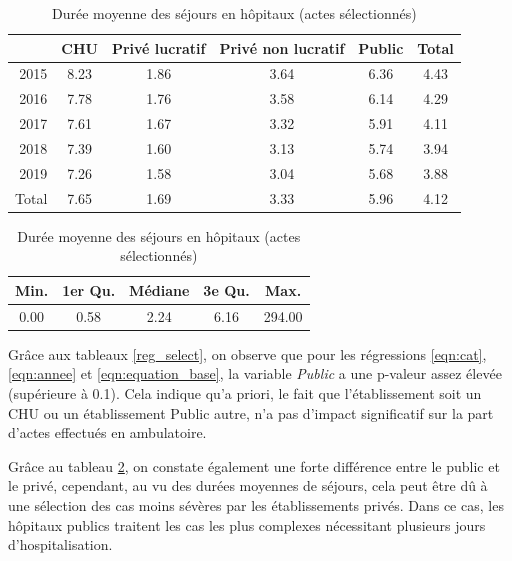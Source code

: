 \begin{table}[ht]
\centering
\caption{Durée moyenne des séjours en hôpitaux (actes sélectionnés)} 
\label{dms_select_moy}
\begin{tabular}{r|cccc|c}
  \hline
 & CHU & Privé lucratif & Privé non lucratif & Public & Total \\ 
  \hline
2015 & 8.23 & 1.86 & 3.64 & 6.36 & 4.43 \\ 
  2016 & 7.78 & 1.76 & 3.58 & 6.14 & 4.29 \\ 
  2017 & 7.61 & 1.67 & 3.32 & 5.91 & 4.11 \\ 
  2018 & 7.39 & 1.60 & 3.13 & 5.74 & 3.94 \\ 
  2019 & 7.26 & 1.58 & 3.04 & 5.68 & 3.88 \\ 
  \hline
  Total & 7.65 & 1.69 & 3.33 & 5.96 & 4.12 \\ 
   \hline
\end{tabular}

\bigskip

\begin{tabular}{ccccc}
  \hline
Min. & 1er Qu. & Médiane & 3e Qu. & Max. \\ 
  \hline
0.00 & 0.58 & 2.24 & 6.16 & 294.00 \\ 
   \hline
\end{tabular}
\end{table}


\bigskip

Grâce aux tableaux \ref{reg_select}, on observe que pour les régressions \ref{eqn:cat}, \ref{eqn:annee} et \ref{eqn:equation_base}, la variable \textit{Public} a une p-valeur assez élevée (supérieure à 0.1). Cela indique qu'a priori, le fait que l'établissement soit un CHU ou un établissement Public autre, n'a pas d'impact significatif sur la part d'actes effectués en ambulatoire.

Grâce au tableau \ref{dms_select_moy}, on constate également une forte différence entre le public et le privé, cependant, au vu des durées moyennes de séjours, cela peut être dû à une sélection des cas moins sévères par les établissements privés. Dans ce cas, les hôpitaux publics traitent les cas les plus complexes nécessitant plusieurs jours d'hospitalisation.\\


